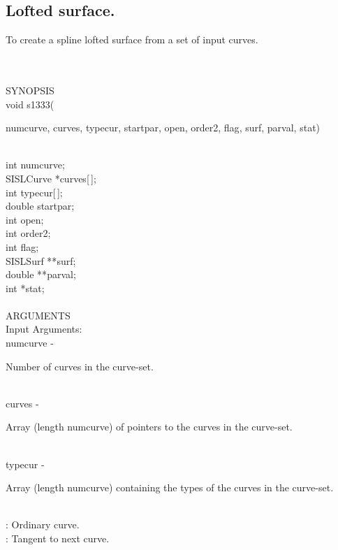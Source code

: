 \subsection{Lofted surface.}
\begin{minipg1}
To create a spline lofted surface from a set of input curves.
\end{minipg1} \\ \\
SYNOPSIS\\
	\>void s1333(\begin{minipg3}
			{\fov numcurve}, {\fov curves}, {\fov typecur}, {\fov startpar}, {\fov open}, {\fov order2},
			{\fov flag}, {\fov surf}, {\fov parval}, {\fov stat})
		\end{minipg3}\\[0.3ex]
		\>\>	int	\> 	{\fov numcurve};\\
		\>\>	SISLCurve	\>	*{\fov curves}[\,];\\
		\>\>	int	\>	{\fov typecur}[\,];\\
		\>\>	double	\>	{\fov startpar};\\
		\>\>	int 	\>	{\fov open};\\
		\>\>	int 	\>	{\fov order2};\\
		\>\>	int	\>	{\fov flag};\\
		\>\>	SISLSurf	\>	**{\fov surf};\\
		\>\>	double 	\>	**{\fov parval};\\
		\>\>	int 	\>	*{\fov stat};\\
\\
ARGUMENTS\\
	\>Input Arguments:\\
	\>\>	{\fov numcurve}\> - \>	\begin{minipg2}
				Number of curves in the curve-set.
				\end{minipg2}\\
	\>\>	{\fov curves}\> - \>	\begin{minipg2}
				Array (length numcurve) of pointers to the curves in the 
				curve-set.
				\end{minipg2}\\[0.8ex]
	\>\>	{\fov typecur}\> - \>	\begin{minipg2}
				Array (length numcurve) containing the types of the curves	
				in the curve-set.
				\end{minipg2}\\[0.8ex]
		\>\>\>\> : \>	Ordinary curve.\\
		\>\>\>\> : \>	Tangent to next curve.\\
